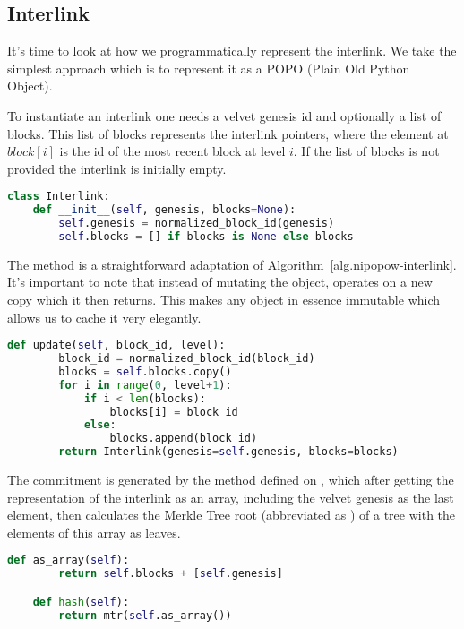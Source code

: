 \subsection{Interlink}

It's time to look at how we programmatically represent the interlink. We take the simplest approach which is to represent it as a POPO (Plain Old Python Object).

To instantiate an interlink one needs a velvet genesis id and optionally a list of blocks. This list of blocks represents the interlink pointers, where the element at $block[i]$ is the id of the most recent block at level $i$. If the list of blocks is not provided the interlink is initially empty.

\begin{lstlisting}[language=Python]
class Interlink:
    def __init__(self, genesis, blocks=None):
        self.genesis = normalized_block_id(genesis)
        self.blocks = [] if blocks is None else blocks
\end{lstlisting}

The  method is a straightforward adaptation of Algorithm~\ref{alg.nipopow-interlink}. It's important to note that instead of mutating the  object,  operates on a new copy which it then returns. This makes any  object in essence immutable which allows us to cache it very elegantly.

\begin{lstlisting}[language=Python]
    def update(self, block_id, level):
        block_id = normalized_block_id(block_id)
        blocks = self.blocks.copy()
        for i in range(0, level+1):
            if i < len(blocks):
                blocks[i] = block_id
            else:
                blocks.append(block_id)
        return Interlink(genesis=self.genesis, blocks=blocks)
\end{lstlisting}

The commitment is generated by the  method defined on , which after getting the representation of the interlink as an array, including the velvet genesis as the last element, then calculates the Merkle Tree root (abbreviated as ) of a tree with the elements of this array as leaves.

\begin{lstlisting}[language=Python]
    def as_array(self):
        return self.blocks + [self.genesis]

    def hash(self):
        return mtr(self.as_array())
\end{lstlisting}

